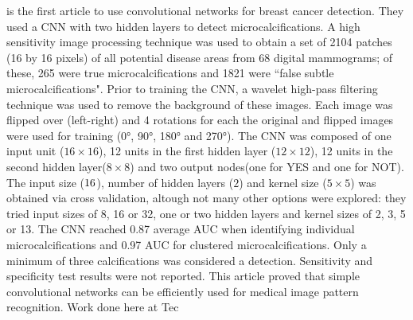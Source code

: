\cite{Lo1995} is the first article to use convolutional networks for breast cancer detection. They used a CNN with two hidden layers to detect microcalcifications. A high sensitivity image processing technique was used to obtain a set of 2104 patches (16 by 16 pixels) of all potential disease areas from 68 digital mammograms; of these, 265 were true microcalcifications and 1821 were ``false subtle microcalcifications". Prior to training the CNN, a wavelet high-pass filtering technique was used to remove the background of these images. Each image was flipped over (left-right) and 4 rotations for each the original and flipped images were used for training (0°, 90°, 180° and 270°). The CNN was composed of one input unit ($16\times16$), 12 units in the first hidden layer ($12\times12$), 12 units in the second hidden layer($8\times 8$) and two output nodes(one for YES and one for NOT). The input size ($16\time16$), number of hidden layers ($2$) and kernel size ($5\times5$) was obtained via cross validation, altough not many other options were explored: they tried input sizes of 8, 16 or 32, one or two hidden layers and kernel sizes of 2, 3, 5 or 13. The CNN reached 0.87 average AUC when identifying individual microcalcifications and 0.97 AUC for clustered microcalcifications. Only a minimum of three calcifications was considered a detection. Sensitivity and specificity test results were not reported. This article proved that simple convolutional networks can be efficiently used for medical image pattern recognition.
Work done here at Tec
\\
